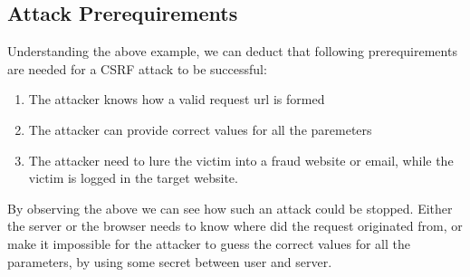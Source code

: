 \subsection{Attack Prerequirements}
Understanding the above example, we can deduct that following prerequirements are needed for a CSRF attack to be
successful:
\begin{enumerate}
	\item The attacker knows how a valid request url is formed 
	\item The attacker can provide correct values for all the paremeters
	\item The attacker need to lure the victim into a fraud website or email, while the victim is logged in the target website.
\end{enumerate}    
By observing the above we can see how such an attack could be stopped.  Either the server or the browser needs to know
where did the request originated from, or make it impossible for the attacker to guess the correct values for all the
parameters, by using some secret between user and server. 
